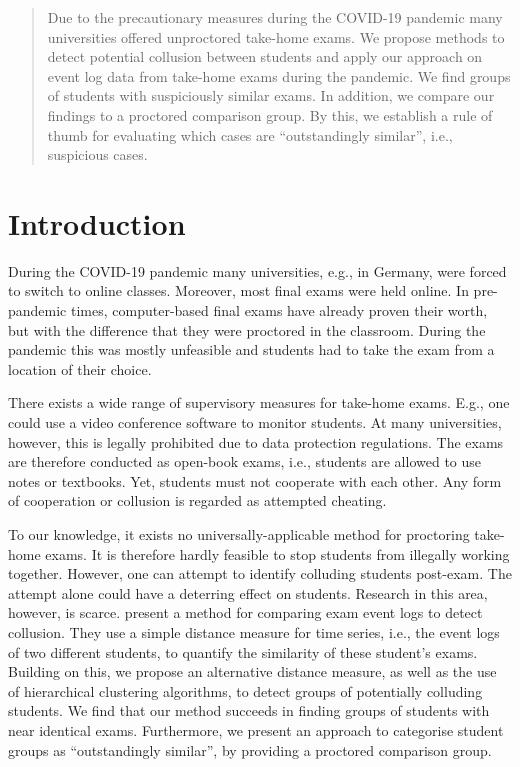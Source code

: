 \documentclass{edm_article}
\begin{document}
\begin{abstract}
Due to the precautionary measures during the COVID-19 pandemic many universities offered unproctored take-home exams. We propose methods to detect potential collusion between students and apply our approach on event log data from take-home exams during the pandemic. We find groups of students with suspiciously similar exams. In addition, we compare our findings to a proctored comparison group. By this, we establish a rule of thumb for evaluating which cases are ``outstandingly similar'', i.e., suspicious cases.
\end{abstract}



\section{Introduction}\label{sec:intro}

During the COVID-19 pandemic many universities, e.g., in Germany, were forced to switch to online classes. Moreover, most final exams were held online. In pre-pandemic times, computer-based final exams have already proven their worth, but with the difference that they were proctored in the classroom. During the pandemic this was mostly unfeasible and students had to take the exam from a location of their choice. 

There exists a wide range of supervisory measures for take-home exams. E.g., one could use a video conference software to monitor students. At many universities, however, this is legally prohibited due to data protection regulations. The exams are therefore conducted as open-book exams, i.e., students are allowed to use notes or textbooks. Yet, students must not cooperate with each other. Any form of cooperation or collusion is regarded as attempted cheating.

To our knowledge, it exists no universally-applicable method for proctoring take-home exams. It is therefore hardly feasible to stop students from illegally working together. However, one can attempt to identify colluding students post-exam. The attempt alone could have a deterring effect on students. Research in this area, however, is scarce. \cite{cleophas2021s} present a method for comparing exam event logs to detect collusion. They use a simple distance measure for time series, i.e., the event logs of two different students, to quantify the similarity of these student's exams. Building on this, we propose an alternative distance measure, as well as the use of hierarchical clustering algorithms, to detect groups of potentially colluding students. We find that our method succeeds in finding groups of students with near identical exams. Furthermore, we present an approach to categorise student groups as ``outstandingly similar'', by providing a proctored comparison group. 
\end{document}
